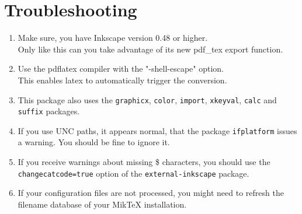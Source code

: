 \documentclass{article}
\begin{document}
\section{Troubleshooting}
\begin{enumerate}
	\item Make sure, you have Inkscape version 0.48 or higher. \\
	      Only like this can you take advantage of its new pdf\_tex export function.
	\item Use the pdflatex compiler with the "-shell-escape" option. \\
	      This enables latex to automatically trigger the conversion.
	\item This package also uses the \texttt{graphicx}, \texttt{color}, \texttt{import}, \texttt{xkeyval}, \texttt{calc} and \texttt{suffix} packages.
	\item If you use UNC paths, it appears normal, that the package \texttt{ifplatform} issues a warning. You should be fine to ignore it.
	\item If you receive warnings about missing \$ characters, you should use the \texttt{changecatcode=true} option of the \texttt{external-inkscape} package.
	\item If your configuration files are not processed, you might need to refresh the filename database of your MikTeX installation.

\end{enumerate}
\end{document}
